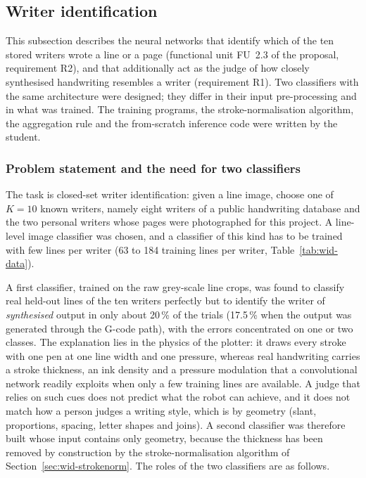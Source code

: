 \subsection{Writer identification}
\label{sec:writerid}

This subsection describes the neural networks that identify which of the ten stored writers wrote a line or a page (functional unit FU~2.3 of the proposal, requirement R2), and that additionally act as the judge of how closely synthesised handwriting resembles a writer (requirement R1).
Two classifiers with the same architecture were designed; they differ in their input pre-processing and in what was trained.
The training programs, the stroke-normalisation algorithm, the aggregation rule and the from-scratch inference code were written by the student.

\subsubsection{Problem statement and the need for two classifiers}

The task is closed-set writer identification: given a line image, choose one of $K=10$ known writers, namely eight writers of a public handwriting database and the two personal writers whose pages were photographed for this project.
A line-level image classifier was chosen, and a classifier of this kind has to be trained with few lines per writer (63 to 184 training lines per writer, Table~\ref{tab:wid-data}).

A first classifier, trained on the raw grey-scale line crops, was found to classify real held-out lines of the ten writers perfectly but to identify the writer of \emph{synthesised} output in only about 20\,\% of the trials (17.5\,\% when the output was generated through the G-code path), with the errors concentrated on one or two classes.
The explanation lies in the physics of the plotter: it draws every stroke with one pen at one line width and one pressure, whereas real handwriting carries a stroke thickness, an ink density and a pressure modulation that a convolutional network readily exploits when only a few training lines are available.
A judge that relies on such cues does not predict what the robot can achieve, and it does not match how a person judges a writing style, which is by geometry (slant, proportions, spacing, letter shapes and joins).
A second classifier was therefore built whose input contains only geometry, because the thickness has been removed by construction by the stroke-normalisation algorithm of Section~\ref{sec:wid-strokenorm}.
The roles of the two classifiers are as follows.

